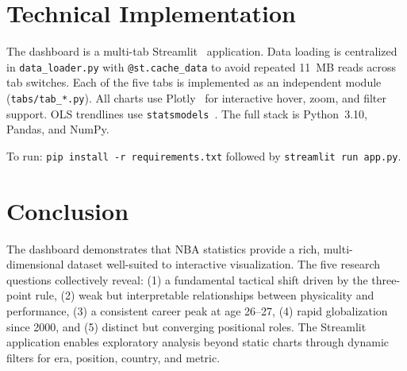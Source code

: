 \documentclass[conference]{IEEEtran}
\begin{document}
\section{Technical Implementation}

The dashboard is a multi-tab Streamlit~\cite{streamlit} application. Data loading is centralized in \texttt{data\_loader.py} with \texttt{@st.cache\_data} to avoid repeated 11~MB reads across tab switches. Each of the five tabs is implemented as an independent module (\texttt{tabs/tab\_*.py}). All charts use Plotly~\cite{plotly} for interactive hover, zoom, and filter support. OLS trendlines use \texttt{statsmodels}~\cite{statsmodels}. The full stack is Python~3.10, Pandas, and NumPy.

To run: \texttt{pip install -r requirements.txt} followed by \texttt{streamlit run app.py}.

\section{Conclusion}

The dashboard demonstrates that NBA statistics provide a rich, multi-dimensional dataset well-suited to interactive visualization. The five research questions collectively reveal: (1) a fundamental tactical shift driven by the three-point rule, (2) weak but interpretable relationships between physicality and performance, (3) a consistent career peak at age 26--27, (4) rapid globalization since 2000, and (5) distinct but converging positional roles. The Streamlit application enables exploratory analysis beyond static charts through dynamic filters for era, position, country, and metric.
\end{document}
